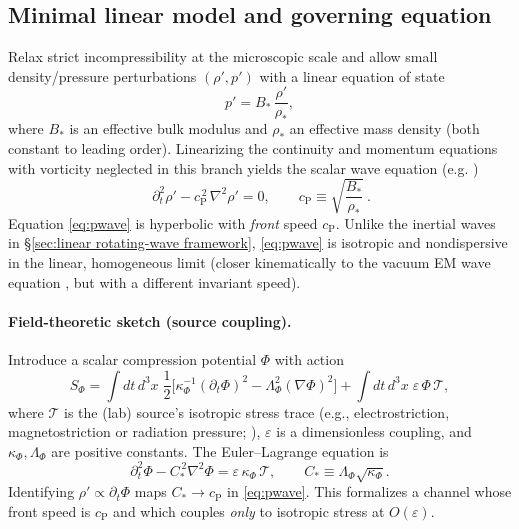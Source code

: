 \documentclass[12pt]{article}
\begin{document}
\subsection{Minimal linear model and governing equation}
Relax strict incompressibility at the microscopic scale and allow small density/pressure perturbations $(\rho',p')$ with a linear equation of state
\begin{equation}
p' = B_*\,\frac{\rho'}{\rho_*},
\end{equation}
where $B_*$ is an effective bulk modulus and $\rho_*$ an effective mass density (both constant to leading order). Linearizing the continuity and momentum equations with vorticity neglected in this branch yields the scalar wave equation (e.g. \cite{LandauFluids,Lighthill78})
\begin{equation}
\boxed{~\partial_t^2 \rho' - c_{\mathrm{P}}^{\,2}\,\nabla^2 \rho' = 0,
\qquad c_{\mathrm{P}} \equiv \sqrt{\frac{B_*}{\rho_*}}~.}
\label{eq:pwave}
\end{equation}
Equation \eqref{eq:pwave} is hyperbolic with \emph{front} speed $c_{\mathrm{P}}$. Unlike the inertial waves in \S\ref{sec:linear rotating-wave framework}, \eqref{eq:pwave} is isotropic and nondispersive in the linear, homogeneous limit (closer kinematically to the vacuum EM wave equation \cite{Jackson1999}, but with a different invariant speed).

\paragraph{Field-theoretic sketch (source coupling).}
Introduce a scalar compression potential $\Phi$ with action
\begin{equation}
S_\Phi=\int\!dt\,d^3x\;\frac{1}{2}\Big[\kappa_\Phi^{-1}(\partial_t \Phi)^2
- \Lambda_\Phi^2(\nabla\Phi)^2\Big]
+\int\!dt\,d^3x\;\varepsilon\,\Phi\,\mathcal{T},
\end{equation}
where $\mathcal{T}$ is the (lab) source's isotropic stress trace (e.g., electrostriction, magnetostriction or radiation pressure; \cite{LandauFluids}), $\varepsilon$ is a dimensionless coupling, and $\kappa_\Phi,\Lambda_\Phi$ are positive constants. The Euler–Lagrange equation is
\begin{equation}
\partial_t^2 \Phi - C_*^{\,2}\nabla^2 \Phi = \varepsilon\,\kappa_\Phi\,\mathcal{T},
\qquad C_* \equiv \Lambda_\Phi\sqrt{\kappa_\Phi}.
\label{eq:Phi}
\end{equation}
Identifying $\rho'\propto\partial_t\Phi$ maps $C_*\to c_{\mathrm{P}}$ in \eqref{eq:pwave}. This formalizes a channel whose front speed is $c_{\mathrm{P}}$ and which couples \emph{only} to isotropic stress at $O(\varepsilon)$.
\end{document}
